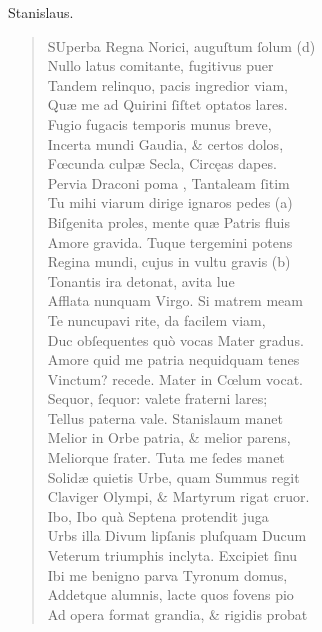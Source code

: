 \documentclass[a4paper,12pt]{article}
\begin{document}
Stanislaus.
\begin{verse}
SUperba Regna Norici, auguſtum ſolum (d)\footnotemark\\[0pt]
Nullo latus comitante, fugitivus puer\\[0pt]
Tandem relinquo, pacis ingredior viam,\\[0pt]
Quæ me ad Quirini ſiſtet optatos lares.\\[0pt]
Fugio fugacis temporis munus breve,\\[0pt]
Incerta mundi Gaudia, \& certos dolos,\\[0pt]
Fœcunda culpæ Secla, Circęas dapes.\\[0pt]
Pervia Draconi poma , Tantaleam ſitim\\[0pt]
Tu mihi viarum dirige ignaros pedes (a)\footnotemark\\[0pt]
Biſgenita proles, mente quæ Patris fluis\\[0pt]
Amore gravida. Tuque tergemini potens\\[0pt]
Regina mundi, cujus in vultu gravis (b)\footnotemark\\[0pt]
Tonantis ira detonat, avita lue\\[0pt]
Afflata nunquam Virgo. Si matrem meam\\[0pt]
Te nuncupavi rite, da facilem viam,\\[0pt]
Duc obſequentes quò vocas Mater gradus.\\[0pt]
Amore quid me patria nequidquam tenes\\[0pt]
Vinctum? recede. Mater in Cœlum vocat.\\[0pt]
Sequor, ſequor: valete fraterni lares;\\[0pt]
Tellus paterna vale. Stanislaum manet\\[0pt]
Melior in Orbe patria, \& melior parens,\\[0pt]
Meliorque ſrater. Tuta me ſedes manet\\[0pt]
Solidæ quietis Urbe, quam Summus regit\\[0pt]
Claviger Olympi, \& Martyrum rigat cruor.\\[0pt]
Ibo, Ibo quà Septena protendit juga\\[0pt]
Urbs illa Divum lipſanis pluſquam Ducum\\[0pt]
Veterum triumphis inclyta. Excipiet ſinu\\[0pt]
Ibi me benigno parva Tyronum domus,\\[0pt]
Addetque alumnis, lacte quos fovens pio\\[0pt]
Ad opera format grandia, \& rigidis probat\\[0pt]

\end{verse}
\end{document}
